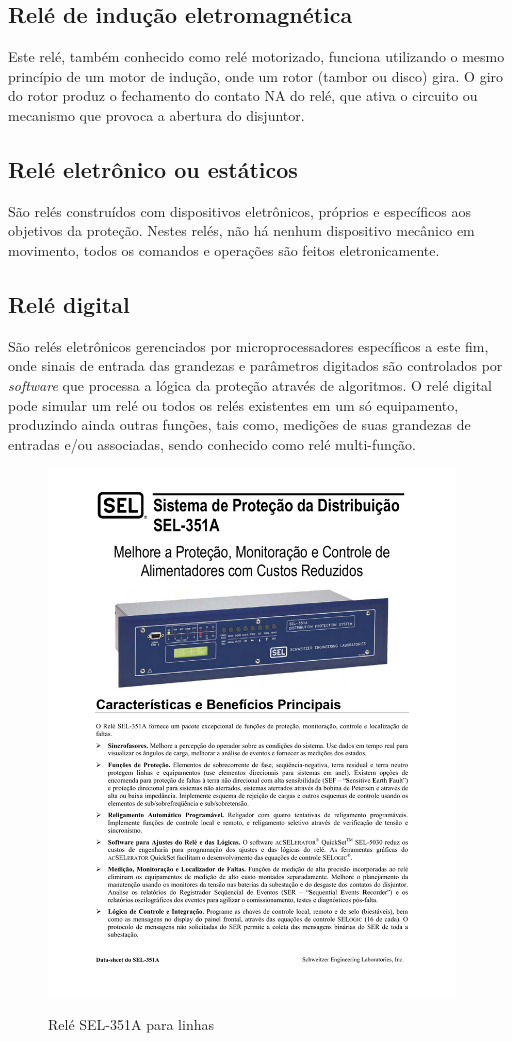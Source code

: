 \documentclass[a5paper,english,spanish,brazil]{ufsc-thesis}
\begin{document}
\subsection{Relé de indução eletromagnética}
Este relé, também conhecido como relé motorizado, funciona utilizando o mesmo princípio de um motor de indução, onde um rotor (tambor ou disco) gira. O giro do rotor produz o fechamento do contato NA do relé, que ativa o circuito ou mecanismo que provoca a abertura do disjuntor.\par

\subsection{Relé eletrônico ou estáticos}
São relés construídos com dispositivos eletrônicos, próprios e específicos aos objetivos da proteção. Nestes relés, não há nenhum dispositivo mecânico em movimento, todos os comandos e operações são feitos eletronicamente.\par

\subsection{Relé digital}
São relés eletrônicos gerenciados por microprocessadores específicos a este fim, onde sinais de entrada das grandezas e parâmetros digitados são controlados por \textit{software} que processa a lógica da proteção através de algoritmos. O relé digital pode simular um relé ou todos os relés existentes em um só equipamento, produzindo ainda outras funções, tais como, medições de suas grandezas de entradas e/ou associadas, sendo conhecido como relé multi-função.\par

\begin{figure}[htb]
  \caption{Relé SEL-351A para linhas}
  \centering
  \includegraphics[width=10.8cm]{sel.pdf}
  \label{fig:rele}
\end{figure}
\end{document}
